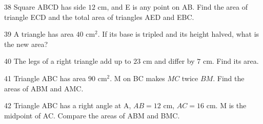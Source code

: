 \gap
\begin{probbox}{38}{}
Square ABCD has side $12$ cm, and E is any point on AB. Find the area of triangle ECD and the total area of triangles AED and EBC.
\end{probbox}
\gap
\begin{probbox}{39}{}
A triangle has area $40$ cm$^2$. If its base is tripled and its height halved, what is the new area?
\end{probbox}
\gap
\begin{probbox}{40}{}
The legs of a right triangle add up to $23$ cm and differ by $7$ cm. Find its area.
\end{probbox}
\gap
\begin{probbox}{41}{}
Triangle ABC has area $90$ cm$^2$. M on BC makes $MC$ twice $BM$. Find the areas of ABM and AMC.
\end{probbox}
\gap
\begin{probbox}{42}{}
Triangle ABC has a right angle at A, $AB=12$ cm, $AC=16$ cm. M is the midpoint of AC. Compare the areas of ABM and BMC.
\end{probbox}
